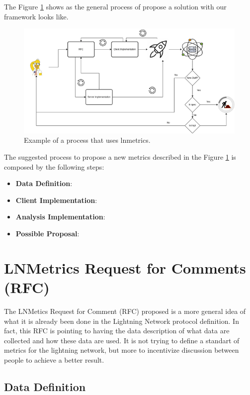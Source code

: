 The Figure \ref{fig:lnmetrics_process} shows as the general process of propose 
a solution with our framework looks like.

\begin{figure}
    \begin{center}
      \includegraphics[scale=0.7]{imgs/lnmetrics-workflow-drawio.png}
    \end{center}
    \caption{Example of a process that uses lnmetrics.}
    \label{fig:lnmetrics_process}
\end{figure}

The suggested process to propose a new metrics described in the Figure \ref{fig:lnmetrics_process}
is composed by the following steps:

\begin{itemize}
    \item {\bf Data Definition}:
    \item {\bf Client Implementation}:
    \item {\bf Analysis Implementation}:
    \item {\bf Possible Proposal}:
\end{itemize}

\section{LNMetrics Request for Comments (RFC)}

The LNMetics Request for Comment (RFC) proposed is a more general idea of what 
it is already been done in the Lightning Network protocol definition. In fact,
this RFC is pointing to having the data description of what data are collected 
and how these data are used. It is not trying to define a 
standart of metrics for the lightning network, 
but more to incentivize discussion between people to achieve a better result.

\subsection{Data Definition}

